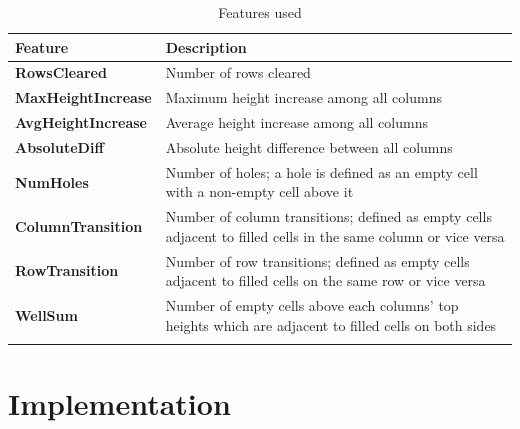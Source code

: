 \documentclass[12pt]{article}
\numberwithin{table}{section}
\numberwithin{figure}{section}
\begin{document}
\begin{longtable}[c]{|p{4cm}|p{12.5cm}|}
\hline
\textbf{Feature}  & \textbf{Description} \\ \hline
\textbf{RowsCleared }      & Number of rows cleared \\ \hline
\textbf{MaxHeightIncrease} & Maximum height increase among all columns \\ \hline
\textbf{AvgHeightIncrease} & Average height increase among all columns \\ \hline
\textbf{AbsoluteDiff}      & Absolute height difference between all columns \\ \hline
\textbf{NumHoles}          & Number of holes; a hole is defined as an empty cell with a non-empty cell above it \\ \hline
\textbf{ColumnTransition}  & Number of column transitions; defined as empty cells adjacent to filled cells in the same column or vice versa \\ \hline
\textbf{RowTransition}     & Number of row transitions; defined as empty cells adjacent to filled cells on the same row or vice versa \\ \hline
\textbf{WellSum}           & Number of empty cells above each columns' top heights which are adjacent to filled cells on both sides \\ \hline
\caption{Features used}
\label{tab:features}
\end{longtable}

\section{Implementation}
% 
% 

\end{document}
